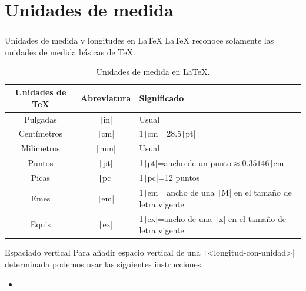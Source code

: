\section{Unidades de medida}

\begin{frame}
	\frametitle{\secname}

	\begin{block}{Unidades de medida y longitudes en \LaTeX}
		\LaTeX{} reconoce solamente las unidades de medida básicas de \TeX.
		\begin{table}[ht!]
			\centering
			\begin{tabular}{ccl}
				\hline
				Unidades de \TeX & Abreviatura            & Significado                                                                              \\
				\hline
				Pulgadas         & \texttt|in| & Usual                                                                                    \\
				\hline
				Centímetros      & \texttt|cm| & 1\texttt|cm|=28.5\texttt|pt|                                       \\
				\hline
				Milímetros       & \texttt|mm| & Usual                                                                                    \\
				\hline
				Puntos           & \texttt|pt| & 1\texttt|pt|=ancho de un punto$\approx 0.35146$\texttt|cm|         \\
				\hline
				Picas            & \texttt|pc| & 1\texttt|pc|=12 puntos                                                        \\
				\hline
				Emes             & \texttt|em| & 1\texttt|em|=ancho de una \texttt|M| en el tamaño de letra vigente \\
				\hline
				Equis            & \texttt|ex| & 1\texttt|ex|=ancho de una \texttt|x| en el tamaño de letra vigente \\
				\hline
			\end{tabular}
			\caption{Unidades de medida en \LaTeX.}
		\end{table}
	\end{block}

	\pause

	\begin{block}{Espaciado vertical}
		Para añadir espacio vertical de una
		\texttt|<longitud-con-unidad>| determinada podemos
		usar las siguientes instrucciones.
		\vspace*{-\baselineskip}\setlength\belowdisplayshortskip{0pt}
		\begin{itemize}
			\item


\end{itemize}
\end{block}
\end{frame}
